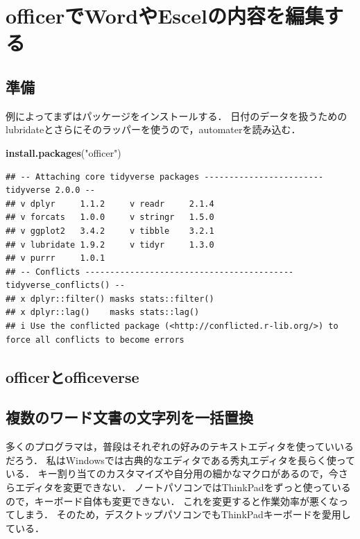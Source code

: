 \documentclass[
]{article}
\newenvironment{Shaded}{\begin{snugshade}}{\end{snugshade}}
\newcommand{\FunctionTok}[1]{\textcolor[rgb]{0.13,0.29,0.53}{\textbf{#1}}}
\newcommand{\NormalTok}[1]{#1}
\newcommand{\StringTok}[1]{\textcolor[rgb]{0.31,0.60,0.02}{#1}}
\begin{document}
\hypertarget{officer}{%
\section{officerでWordやEscelの内容を編集する}\label{officer}}

\hypertarget{ux6e96ux5099-17}{%
\subsection{準備}\label{ux6e96ux5099-17}}

例によってまずはパッケージをインストールする．
日付のデータを扱うためのlubridateとさらにそのラッパーを使うので，automaterを読み込む．

\begin{Shaded}
\begin{Highlighting}[]
\FunctionTok{install.packages}\NormalTok{(}\StringTok{"officer"}\NormalTok{)}
\end{Highlighting}
\end{Shaded}

\begin{verbatim}
## -- Attaching core tidyverse packages ------------------------ tidyverse 2.0.0 --
## v dplyr     1.1.2     v readr     2.1.4
## v forcats   1.0.0     v stringr   1.5.0
## v ggplot2   3.4.2     v tibble    3.2.1
## v lubridate 1.9.2     v tidyr     1.3.0
## v purrr     1.0.1     
## -- Conflicts ------------------------------------------ tidyverse_conflicts() --
## x dplyr::filter() masks stats::filter()
## x dplyr::lag()    masks stats::lag()
## i Use the conflicted package (<http://conflicted.r-lib.org/>) to force all conflicts to become errors
\end{verbatim}

\hypertarget{officerux3068officeverse}{%
\subsection{officerとofficeverse}\label{officerux3068officeverse}}

\hypertarget{ux8907ux6570ux306eux30efux30fcux30c9ux6587ux66f8ux306eux6587ux5b57ux5217ux3092ux4e00ux62ecux7f6eux63db}{%
\subsection{複数のワード文書の文字列を一括置換}\label{ux8907ux6570ux306eux30efux30fcux30c9ux6587ux66f8ux306eux6587ux5b57ux5217ux3092ux4e00ux62ecux7f6eux63db}}

多くのプログラマは，普段はそれぞれの好みのテキストエディタを使っていいるだろう．
私はWindowsでは古典的なエディタである秀丸エディタを長らく使っている．
キー割り当てのカスタマイズや自分用の細かなマクロがあるので，今さらエディタを変更できない．
ノートパソコンではThinkPadをずっと使っているので，キーボード自体も変更できない．
これを変更すると作業効率が悪くなってしまう．
そのため，デスクトップパソコンでもThinkPadキーボードを愛用している．
\end{document}
